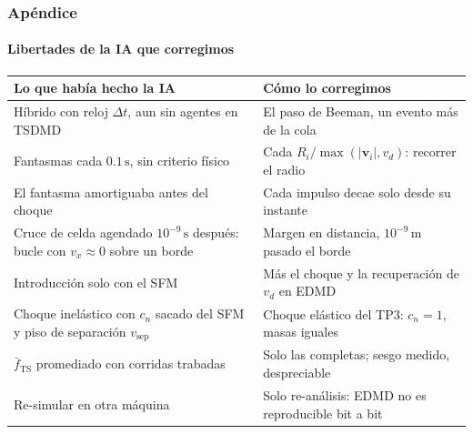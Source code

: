 \documentclass[11pt,aspectratio=169]{beamer}
\makeatletter
\newcommand{\vect}[1]{\mathbf{#1}}          %
\newcommand{\un}[1]{\,\mathrm{#1}}          %
\newcommand{\dt}{\Delta t}
\newcommand{\fTSm}{\bar{f}_{\mathrm{TS}}}
\newcommand{\vd}{v_d}
\newcommand{\cn}{c_n}
\newcommand{\partes}[1]{%
  \par\vspace{0.3em}{\centering\scriptsize\renewcommand{\arraystretch}{1.2}%
  \begin{tabular}{@{}r@{\,: }l@{\qquad}r@{\,: }l@{}}#1\end{tabular}\par}\vspace{0.5em}}
\makeatother
\begin{document}
\begin{frame}
  \frametitle{Apéndice}
  \framesubtitle{Libertades de la IA que corregimos}

  \vfill
  \begin{center}
    \scriptsize
    \renewcommand{\arraystretch}{1.5}
    \begin{tabular}{@{}p{}@{\hspace{1.2em}}p{}@{}}
      \toprule
      \textbf{Lo que había hecho la IA} & \textbf{Cómo lo corregimos}\\
      \midrule
      Híbrido con reloj $\dt$, aun sin agentes en TSDMD & El paso de Beeman, un evento más de la cola\\
      Fantasmas cada $0.1\un{s}$, sin criterio físico & Cada $R_i/\max(|\vect{v}_i|,\vd)$: recorrer el radio\\
      El fantasma amortiguaba antes del choque & Cada impulso decae solo desde su instante\\
      Cruce de celda agendado $10^{-9}\un{s}$ después: bucle con $v_x\approx0$ sobre un borde & Margen en
        distancia, $10^{-9}\un{m}$ pasado el borde\\
      Introducción solo con el SFM & Más el choque y la recuperación de $\vd$ en EDMD\\
      Choque inelástico con $\cn$ sacado del SFM y piso de separación $v_{\mathrm{sep}}$ & Choque elástico del TP3:
        $\cn=1$, masas iguales\\
      $\fTSm$ promediado con corridas trabadas & Solo las completas; sesgo medido, despreciable\\
      Re-simular en otra máquina & Solo re-análisis: EDMD no es reproducible bit a bit\\
      \bottomrule
    \end{tabular}
  \end{center}
  \vfill
\end{frame}

\appendix
\end{document}
